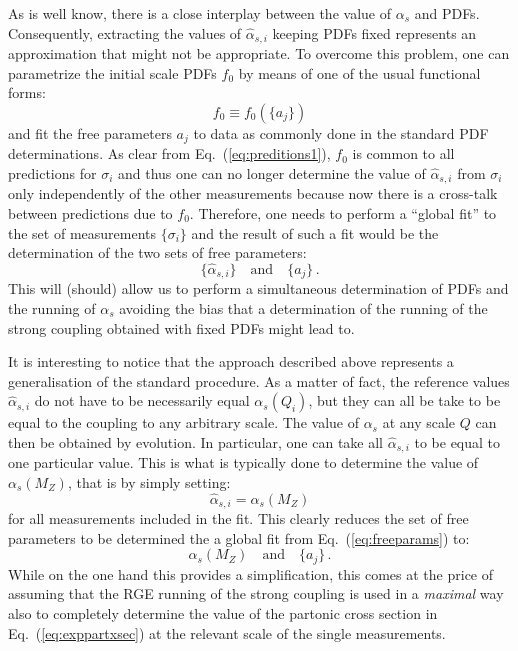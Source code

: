 \documentclass[10pt,a4paper]{article}
\begin{document}
As is well know, there is a close interplay between the value of
$\alpha_s$ and PDFs. Consequently, extracting the values of
$\hat\alpha_{s,i}$ keeping PDFs fixed represents an approximation that
might not be appropriate. To overcome this problem, one can
parametrize the initial scale PDFs $f_0$ by means of one of the usual
functional forms:
\begin{equation}
f_0\equiv f_0(\{a_j\})
\end{equation}
and fit the free parameters $a_j$ to data as commonly done in the
standard PDF determinations. As clear from Eq.~(\ref{eq:preditions1}),
$f_0$ is common to all predictions for $\sigma_i$ and thus one can no
longer determine the value of $\hat\alpha_{s,i}$ from $\sigma_i$ only
independently of the other measurements because now there is a
cross-talk between predictions due to $f_0$. Therefore, one needs to
perform a ``global fit'' to the set of measurements $\{\sigma_i\}$ and
the result of such a fit would be the determination of the two sets of
free parameters:
\begin{equation}\label{eq:freeparams}
\{\hat\alpha_{s,i}\}\quad\mbox{and}\quad\{a_j\}\,.
\end{equation}
This will (should) allow us to perform a simultaneous determination of
PDFs and the running of $\alpha_s$ avoiding the bias that a
determination of the running of the strong coupling obtained with
fixed PDFs might lead to.

It is interesting to notice that the approach described above
represents a generalisation of the standard procedure. As a matter of
fact, the reference values $\hat\alpha_{s,i}$ do not have to be
necessarily equal $\alpha_s(Q_i)$, but they can all be take to be
equal to the coupling to any arbitrary scale. The value of $\alpha_s$
at any scale $Q$ can then be obtained by evolution. In particular, one
can take all $\hat\alpha_{s,i}$ to be equal to one particular
value. This is what is typically done to determine the value of
$\alpha_s(M_Z)$, that is by simply setting:
\begin{equation}
\hat\alpha_{s,i} = \alpha_s(M_Z)
\end{equation}
for all measurements included in the fit. This clearly reduces the set
of free parameters to be determined the a global fit from
Eq.~(\ref{eq:freeparams}) to:
\begin{equation}
\alpha_s(M_Z)\quad\mbox{and}\quad\{a_j\}\,.
\end{equation}
While on the one hand this provides a simplification, this comes at
the price of assuming that the RGE running of the strong coupling is
used in a \textit{maximal} way also to completely determine the value
of the partonic cross section in Eq.~(\ref{eq:exppartxsec}) at the
relevant scale of the single measurements.
\end{document}
